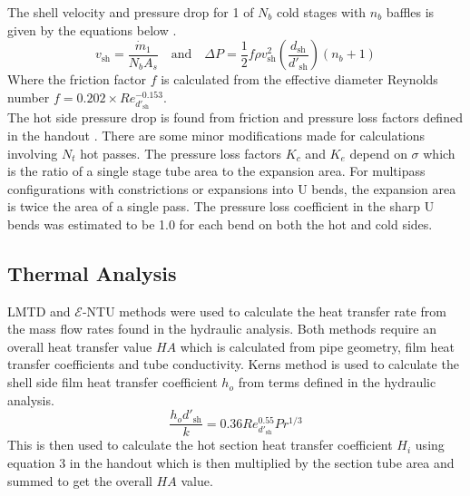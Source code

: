 \documentclass{article}
\begin{document}
The shell velocity and pressure drop for 1 of $N_b$ cold stages with $n_b$ baffles is given by the equations below \cite{HE_design}.
\begin{equation}
  v_\text{sh} = \frac{\dot{m}_1}{N_b A_s} \quad \text{and} \quad \Delta P = \frac{1}{2}f \rho v_\text{sh}^2 \left( \frac{d_\text{sh}}{d'_\text{sh}} \right) (n_b + 1)
\end{equation}
Where the friction factor $f$ is calculated from the effective diameter Reynolds number $f = 0.202 \times Re_{d'_\text{sh}}^{-0.153}$. \\
The hot side pressure drop is found from friction and pressure loss factors defined in the handout \cite{handout}.
There are some minor modifications made for calculations involving $N_t$ hot passes.
The pressure loss factors $K_c$ and $K_e$ depend on $\sigma$ which is the ratio of a single stage tube area to the expansion area.
For multipass configurations with constrictions or expansions into U bends, the expansion area is twice the area of a single pass.
The pressure loss coefficient in the sharp U bends was estimated to be 1.0 for each bend on both the hot and cold sides.


\subsection{Thermal Analysis}

LMTD and $\mathcal{E}$-NTU methods were used to calculate the heat transfer rate from the mass flow rates found in the hydraulic analysis.
Both methods require an overall heat transfer value $HA$ which is calculated from pipe geometry, film heat transfer coefficients and tube conductivity.
Kerns method is used to calculate the shell side film heat transfer coefficient $h_o$ from terms defined in the hydraulic analysis.
\begin{equation}
  \frac{h_o d'_{\text{sh}}}{k} = 0.36 Re^{0.55}_{d'_{\text{sh}}}Pr^{1/3}
\end{equation}
This is then used to calculate the hot section heat transfer coefficient $H_i$ using equation 3 in the handout \cite{handout} which is then
multiplied by the section tube area and summed to get the overall $HA$ value.
\end{document}
